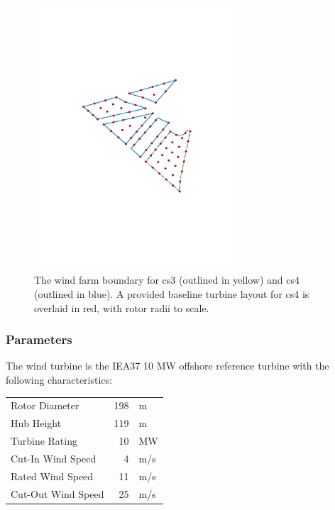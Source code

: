 \documentclass[10pt]{article}
\begin{document}
        \begin{figure}[]
            \begin{center}
            \includegraphics[width=3in, trim={2in 3.2in 1.8in 3.in},clip] {cs4Turbines.pdf}
            \caption{The wind farm boundary for cs3 (outlined in yellow) and cs4 (outlined in blue). A provided baseline turbine layout for cs4 is overlaid in red, with rotor radii to scale.}
            \label{fig:boundary}
            \end{center}
        \end{figure}


    \subsubsection*{Parameters}
    \label{sec:Parameters}
        The wind turbine is the IEA37 10 MW offshore reference turbine \cite{NREL10MW} with the following characteristics:
        \begin{center}
            \begin{tabular}{@{}lrl@{}}
            \toprule
                Rotor Diameter & 198 & m \\
                Hub Height & 119 & m \\
                Turbine Rating & 10 & MW \\ 
                Cut-In Wind Speed & 4 & m/s \\ 
                Rated Wind Speed & 11 & m/s \\ 
                Cut-Out Wind Speed & 25 & m/s \\
            \bottomrule
            \end{tabular}
        \end{center}
\end{document}

